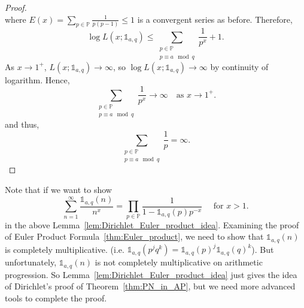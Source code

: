 \documentclass{elegantbook}
\begin{document}
\begin{proof}
\begin{equation}
  \end{equation}
  where $E(x) = \sum_{p \in \mathbb{P}} \frac{1}{p(p-1)}\leq 1$ is a convergent series as before. Therefore,
  \[
    \log L(x;\mathds{1}_{a,q}) \leq \sum_{\substack{p \in \mathbb{P} \\ p \equiv a \mod q}} \frac{1}{p^x} + 1.
  \]
  As $x \to 1^+$, $L(x;\mathds{1}_{a,q}) \to \infty$, so $\log L(x;\mathds{1}_{a,q}) \to \infty$ by continuity of logarithm. Hence,
  \[
    \sum_{\substack{p \in \mathbb{P} \\ p \equiv a \mod q}} \frac{1}{p^x} \to \infty \quad \text{as } x \to 1^+.
  \]
  and thus,
  \[
    \sum_{\substack{p \in \mathbb{P} \\ p \equiv a \mod q}} \frac{1}{p} = \infty.
  \]
\end{proof}

\begin{note}
  Note that if we want to show
  \[
    \sum_{n=1}^{\infty} \frac{\mathds{1}_{a,q}(n)}{n^x} = \prod_{p\in \mathbb{P}} \frac{1}{1 - \mathds{1}_{a,q}(p) p^{-x}} \quad \text{ for } x > 1.
  \]
  in the above Lemma~\ref{lem:Dirichlet_Euler_product_idea}. Examining the proof of Euler Product Formula~\ref{thm:Euler_product}, we need to show that $\mathds{1}_{a,q}(n)$ is completely multiplicative. (i.e. $\mathds{1}_{a,q}(p^jq^k) = \mathds{1}_{a,q}(p)^j\mathds{1}_{a,q}(q)^k$). But unfortunately, $\mathds{1}_{a,q}(n)$ is not completely multiplicative on arithmetic progression. So Lemma~\ref{lem:Dirichlet_Euler_product_idea} just gives the idea of Dirichlet's proof of Theorem~\ref{thm:PN_in_AP}, but we need more advanced tools to complete the proof.


\end{note}
\end{document}
